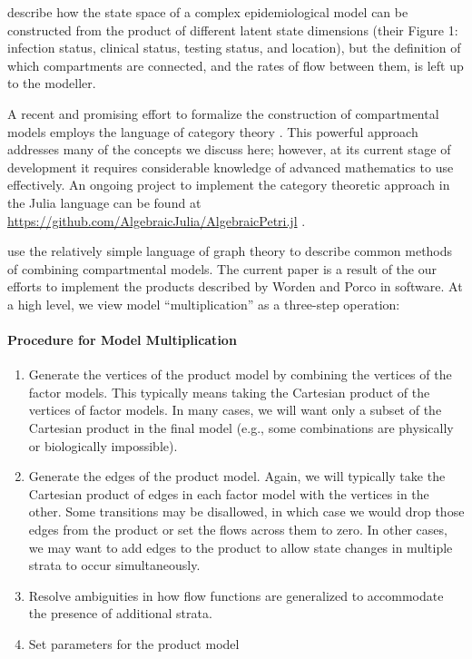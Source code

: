 \documentclass{article}
\theoremstyle{definition}
\begin{document}
\cite{friston2020dynamic} describe how the state space of a complex epidemiological model can be constructed from the product of different latent state dimensions (their Figure 1: infection status, clinical status, testing status, and location), but the definition of which compartments are connected, and the rates of flow between them, is left up to the modeller.

A recent and promising effort to formalize the construction of compartmental models employs the language of category theory \citep{fong2018seven, Libkind2022an, libkind2021operadic, baez2022compositional, baez2017compositional}. This powerful approach addresses many of the concepts we discuss here; however, at its current stage of development it requires considerable knowledge of advanced mathematics to use effectively.  An ongoing project to implement the category theoretic approach in the Julia language can be found at \url{https://github.com/AlgebraicJulia/AlgebraicPetri.jl} \citep{algebraicjulia}. 

\cite{worden2017products} use the relatively simple language of graph theory to describe common methods of combining compartmental models. The current paper is a result of the our efforts to implement the products described by Worden and Porco in software. At a high level, we view model ``multiplication'' as a three-step operation:


\paragraph{Procedure for Model Multiplication}\label{genproc}

\begin{enumerate}
    \item Generate the vertices of the product model by combining the vertices of the factor models. This typically means taking the Cartesian product of the vertices of factor models. In many cases, we will want only a subset of the Cartesian product in the final model (e.g., some combinations are physically or biologically impossible).
    \item Generate the edges of the product model. Again, we will typically take the Cartesian product of edges in each factor model with the vertices in the other. Some transitions may be disallowed, in which case we would drop those edges from the product or set the flows across them to zero. In other cases, we may want to add edges to the product to allow state changes in multiple strata to occur simultaneously.
    \item Resolve ambiguities in how flow functions are generalized to accommodate the presence of additional strata.
    \item Set parameters for the product model
\end{enumerate}
\end{document}
